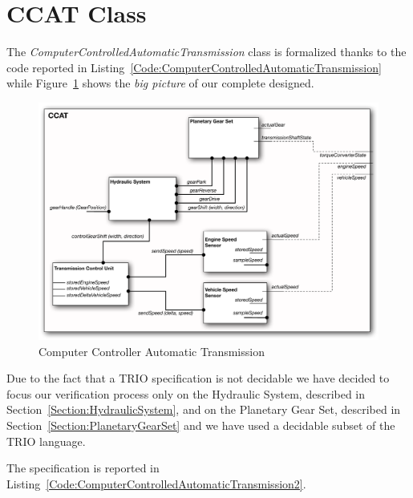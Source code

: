 \section{CCAT Class}
\label{Section:ComputerControlledAutomaticTransmission}
The \emph{ComputerControlledAutomaticTransmission} class is formalized thanks to the code reported in Listing~\ref{Code:ComputerControlledAutomaticTransmission} while Figure~\ref{Figure:CCAT} shows the \emph{big picture} of our complete designed.



\thispagestyle{empty}
\begin{figure}[!p]
\vspace{-3 cm}
\centerline{\includegraphics[scale=0.8,angle=-90]{images/CCAT.pdf}}
\caption{Computer Controller Automatic Transmission}
\label{Figure:CCAT}
\end{figure}

\newpage
Due to the fact that a TRIO specification is not decidable we have decided to focus our verification process only on the Hydraulic System, described in Section~\ref{Section:HydraulicSystem}, and on the Planetary Gear Set, described in Section~\ref{Section:PlanetaryGearSet} and we have used a decidable subset of the TRIO language.

The specification is reported in Listing~\ref{Code:ComputerControlledAutomaticTransmission2}.

